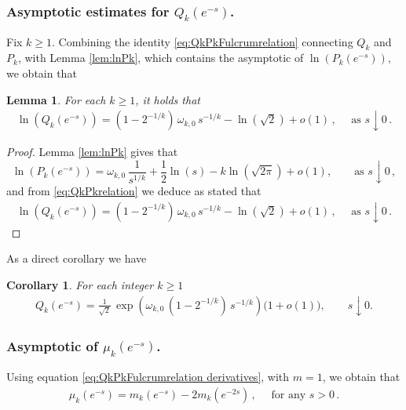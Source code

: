 \documentclass[12pt]{amsart}
\newtheorem{lemma}{Lemma}[section]
\newtheorem{corollary}{Corollary}[section]
\theoremstyle{definition}
\begin{document}
\subsubsection{Asymptotic estimates for $Q_k(e^{-s})$.}

Fix $k \geq 1$. Combining the identity \eqref{eq:QkPkFulcrumrelation} connecting $Q_k$ and $P_k$,
with Lemma \ref{lem:lnPk}, which contains the asymptotic of $\ln (P_k(e^{-s}))$, we obtain that
\begin{lemma}\label{lem: ln(Q_k)_asymptotic} For each $k \geq 1$, it holds that
\begin{align*}
	\ln(Q_k(e^{-s})) = (1-2^{-1/k})\,\omega_{k,0}\, s^{-1/k}-\ln(\sqrt{2})+o(1)\,, \quad \text{ as } s \downarrow 0\,.
\end{align*}
\end{lemma}
\begin{proof} Lemma \ref{lem:lnPk} gives that
\begin{equation*}
	\ln(P_k(e^{-s})) = \omega_{k,0}\,\frac{1}{s^{1/k}} + \frac{1}{2}\ln(s) - k\ln(\sqrt{2\pi}) + o(1), \qquad \text{as } s\downarrow 0\,,
\end{equation*} and from \eqref{eq:QkPkrelation} we deduce as stated that
\begin{align*}
\ln(Q_k(e^{-s})) = (1-2^{-1/k})\,\omega_{k,0}\, s^{-1/k}-\ln(\sqrt{2})+o(1)\,, \quad \text{ as } s \downarrow 0\,.
\end{align*}
\end{proof}
\newpage

As a direct corollary we have~\begin{corollary}\label{cor: ln(Q_k)_asymptotic} For each integer $k \ge 1$
\begin{align*}
Q_k(e^{-s}) =\frac{1}{\sqrt{2}}\,\exp\!\left(\omega_{k,0}\,(1-2^{-1/k})\,s^{-1/k}\right)\bigl(1+o(1)\bigr), \qquad s\downarrow 0.
\end{align*}
\end{corollary}



\subsubsection{Asymptotic of $\mu_k(e^{-s})$.}

Using equation \eqref{eq:QkPkFulcrumrelation derivatives}, with $m=1$, we obtain that
\begin{align}\label{eq: mean_Q_interms_P}
\mu_k(e^{-s}) = m_{k}(e^{-s})-2m_{k}(e^{-2s})\,, \quad \text{ for any }  s>0\,.
\end{align}
\end{document}
